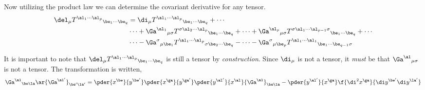 \documentclass{article}
\begin{document}
Now utilizing the product law we can determine the covariant derivative for any tensor.
\begin{align*}
\del_\mu {T^{\al_1 \cdots \al_p}}_{\be_1\cdots\be_q} &= \di_\mu {T^{\al_1 \cdots \al_p}}_{\be_1\cdots\be_q} + \cdots \\
 &\cdots + {\Ga^{\al_1}}_{\mu\sigma}{T^{\sigma \al_2 \cdots \al_p}}_{\be_1\cdots\be_q} + \cdots + {\Ga^{\al_p}}_{\mu\sigma}{T^{\sigma \al_1 \cdots \al_{p-1} \sigma}}_{\be_1\cdots\be_q} + \cdots \\
 &\cdots - {\Ga^{\sigma}}_{\mu\be_1}{T^{\al_1 \cdots \al_p}}_{\sigma\be_2\cdots\be_q} - \cdots - {\Ga^{\sigma}}_{\mu\be_p}{T^{\al_1 \cdots \al_1}}_{\be_1\cdots\be_{q-1}\sigma} \\
\end{align*}

It is important to note that $\del_\mu {T^{\al_1 \cdots \al_p}}_{\be_1\cdots\be_q}$ is still a tensor by \textit{construction}. Since $\di_\mu$ is not a tensor, it \textit{must} be that ${\Ga^\al}_{\mu\sigma}$ is not a tensor. The transformation is written, \\
\[ {\Ga^\al}_{\be\la} \ar {\Ga^{\al'}}_{\be'\la'} = \pder{x^\be}{y^{\be'}}\pder{x^\ga}{y^{\ga'}}\pder{y^{\al'}}{x^{\al}} {\Ga^\al}_{\be\la} - \pder{y^{\al'}}{x^{\ga}}\f{\di^2 x^{\ga}}{\di y^{\be'}\di y^{\la'}}  \]
\end{document}
